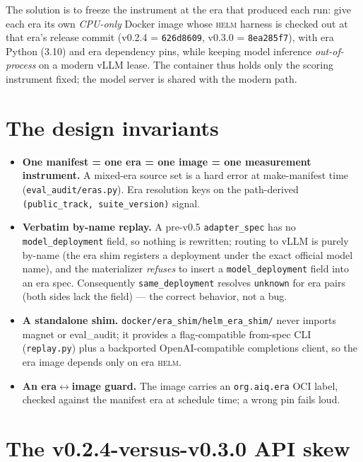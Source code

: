 \documentclass[11pt]{report}
\newcommand{\code}[1]{\texttt{#1}}
\begin{document}
The solution is to freeze the instrument at the era that produced each run: give
each era its own \emph{CPU-only} Docker image whose \textsc{helm} harness is
checked out at that era's release commit (v0.2.4 = \code{626d8609}, v0.3.0 =
\code{8ea285f7}), with era Python (3.10) and era dependency pins, while keeping
model inference \emph{out-of-process} on a modern vLLM lease. The container thus
holds only the scoring instrument fixed; the model server is shared with the
modern path.

\section{The design invariants}

\begin{itemize}[nosep]
  \item \textbf{One manifest = one era = one image = one measurement instrument.} A
        mixed-era source set is a hard error at make-manifest time
        (\code{eval\_audit/eras.py}). Era resolution keys on the path-derived
        \code{(public\_track, suite\_version)} signal.
  \item \textbf{Verbatim by-name replay.} A pre-v0.5 \code{adapter\_spec} has no
        \code{model\_deployment} field, so nothing is rewritten; routing to vLLM is
        purely by-name (the era shim registers a deployment under the exact official
        model name), and the materializer \emph{refuses} to insert a
        \code{model\_deployment} field into an era spec. Consequently
        \code{same\_deployment} resolves \code{unknown} for era pairs (both sides
        lack the field) --- the correct behavior, not a bug.
  \item \textbf{A standalone shim.} \code{docker/era\_shim/helm\_era\_shim/} never
        imports magnet or eval\_audit; it provides a flag-compatible from-spec CLI
        (\code{replay.py}) plus a backported OpenAI-compatible completions client, so
        the era image depends only on era \textsc{helm}.
  \item \textbf{An era$\leftrightarrow$image guard.} The image carries an
        \code{org.aiq.era} OCI label, checked against the manifest era at schedule
        time; a wrong pin fails loud.
\end{itemize}

\section{The v0.2.4-versus-v0.3.0 API skew}
\end{document}
